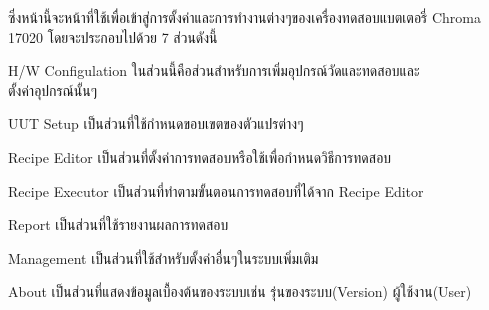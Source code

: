 ซึ่งหน้านี้จะหน้าที่ใช้เพื่อเข้าสู่การตั้งค่าและการทำงานต่างๆของเครื่องทดสอบแบตเตอรี่ Chroma 17020 โดยจะประกอบไปด้วย 7 ส่วนดังนี้
\begin{itemize}
{\item H/W Configulation ในส่วนนี้คือส่วนสำหรับการเพิ่มอุปกรณ์วัดและทดสอบและ\\ตั้งค่าอุปกรณ์นั้นๆ}
{\item UUT Setup เป็นส่วนที่ใช้กำหนดขอบเขตของตัวแปรต่างๆ}
{\item Recipe Editor เป็นส่วนที่ตั้งค่าการทดสอบหรือใช้เพื่อกำหนดวิธีการทดสอบ}
{\item Recipe Executor เป็นส่วนที่ทำตามขั้นตอนการทดสอบที่ได้จาก Recipe Editor}
{\item Report เป็นส่วนที่ใช้รายงานผลการทดสอบ}
{\item Management เป็นส่วนที่ใช้สำหรับตั้งค่าอื่นๆในระบบเพิ่มเติม}
{\item About เป็นส่วนที่แสดงข้อมูลเบื้องต้นของระบบเช่น รุ่นของระบบ(Version) ผู้ใช้งาน(User)}
\end{itemize}
